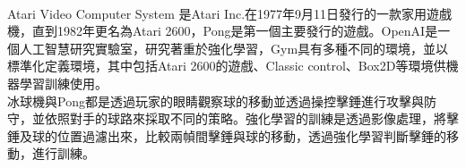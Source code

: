\begin{flushleft}
{\large {}}\\
\end{flushleft}
\qquad Atari Video Computer System 是Atari Inc.在1977年9月11日發行的一款家用遊戲機，直到1982年更名為Atari 2600，Pong是第一個主要發行的遊戲。OpenAI是一個人工智慧研究實驗室，研究著重於強化學習，Gym具有多種不同的環境，並以標準化定義環境，其中包括Atari 2600的遊戲、Classic control、Box2D等環境供機器學習訓練使用。\\

冰球機與Pong都是透過玩家的眼睛觀察球的移動並透過操控擊錘進行攻擊與防守，並依照對手的球路來採取不同的策略。強化學習的訓練是透過影像處理，將擊錘及球的位置過濾出來，比較兩幀間擊錘與球的移動，透過強化學習判斷擊錘的移動，進行訓練。\\

